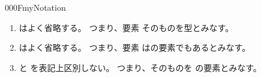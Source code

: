 \documentclass[index]{subfiles}
\begin{document}
\begin{myBlock}{000F}{myNotation}
  \begin{enumerate}
  \item \myInlineMath{\myUniverseEl{\myBlank}}はよく省略する。
    つまり、要素
    そのものを型とみなす。
  \item \myInlineMath{\myUniverseLift{\myBlank}}はよく省略する。
    つまり、要素
    はの要素でもあるとみなす。
  \item {}と
    を表記上区別しない。
    つまり、そのものを
    の要素とみなす。
  \end{enumerate}
\end{myBlock}
\end{document}
